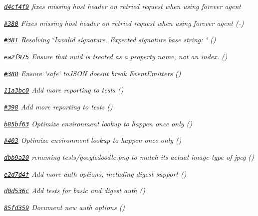 \begin{DoxyItemize}
\item {\itshape \href{https://github.com/mikeal/request/commit/d4cf4f98e11f9a85b6bdfd0481c85c8ac34061ce}{\tt d4cf4f9} fixes missing host header on retried request when using forever agent}
\item {\itshape \href{https://github.com/mikeal/request/pull/380}{\tt \#380} Fixes missing host header on retried request when using forever agent (-\/)}
\item {\itshape \href{https://github.com/mikeal/request/pull/381}{\tt \#381} Resolving \char`\"{}\+Invalid signature. Expected signature base string\+: \char`\"{} ()}
\item {\itshape \href{https://github.com/mikeal/request/commit/ea2f975ae83efe956b77cbcd0fd9ad42c0d5192f}{\tt ea2f975} Ensure that uuid is treated as a property name, not an index. ()}
\item {\itshape \href{https://github.com/mikeal/request/pull/388}{\tt \#388} Ensure \char`\"{}safe\char`\"{} to\+J\+S\+O\+N doesn\textquotesingle{}t break Event\+Emitters ()}
\item {\itshape \href{https://github.com/mikeal/request/commit/11a3bc0ea3063f6f0071248e03c8595bfa9fd046}{\tt 11a3bc0} Add more reporting to tests ()}
\item {\itshape \href{https://github.com/mikeal/request/pull/398}{\tt \#398} Add more reporting to tests ()}
\item {\itshape \href{https://github.com/mikeal/request/commit/b85bf633fe8197dc38855f10016a0a76a8ab600a}{\tt b85bf63} Optimize environment lookup to happen once only ()}
\item {\itshape \href{https://github.com/mikeal/request/pull/403}{\tt \#403} Optimize environment lookup to happen once only ()}
\item {\itshape \href{https://github.com/mikeal/request/commit/dbb9a205fafd7bf5a05d2dbe7eb2c6833b4387dc}{\tt dbb9a20} renaming tests/googledoodle.\+png to match it\textquotesingle{}s actual image type of jpeg ()}
\item {\itshape \href{https://github.com/mikeal/request/commit/e2d7d4fd35869354ba14a333a4b4989b648e1971}{\tt e2d7d4f} Add more auth options, including digest support ()}
\item {\itshape \href{https://github.com/mikeal/request/commit/d0d536c1e5a9a342694ffa5f14ef8fbe8dcfa8bd}{\tt d0d536c} Add tests for basic and digest auth ()}
\item {\itshape \href{https://github.com/mikeal/request/commit/85fd359890646ef9f55cc6e5c6a32e74f4fbb786}{\tt 85fd359} Document new auth options ()}

\end{DoxyItemize}
